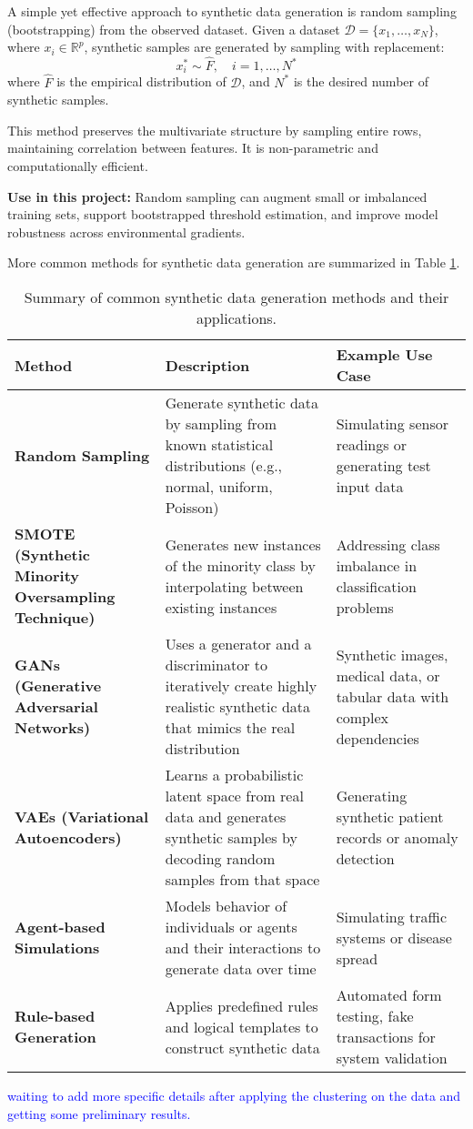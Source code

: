 A simple yet effective approach to synthetic data generation is random sampling (bootstrapping) from the observed dataset.
 Given a dataset \( \mathcal{D} = \{x_1, \dots, x_N\} \), where \( x_i \in \mathbb{R}^p \), 
 synthetic samples are generated by sampling with replacement:
\[
x_i^* \sim \hat{F}, \quad i = 1, \dots, N^*
\]
where \( \hat{F} \) is the empirical distribution of \( \mathcal{D} \), and \( N^* \) is
 the desired number of synthetic samples.

This method preserves the multivariate structure by sampling entire rows, maintaining correlation between features.
 It is non-parametric and computationally efficient.

\textbf{Use in this project:} Random sampling can augment small or imbalanced training sets, support bootstrapped 
threshold estimation, and improve model robustness across environmental gradients.

More common methods for synthetic data generation are summarized in Table \ref{tab:synthetic_data_methods}.

\begin{table}[!h]
\centering
\caption{Summary of common synthetic data generation methods and their applications.}
\label{tab:synthetic_data_methods}
\renewcommand{\arraystretch}{1.3}
\small
\begin{tabular}{|>{\centering\arraybackslash}p{3.5cm}|>{\centering\arraybackslash}p{7cm}|>{\centering\arraybackslash}p{4.2cm}|}
\hline
\textbf{Method} & \textbf{Description} & \textbf{Example Use Case} \\
\hline
\textbf{Random Sampling} & Generate synthetic data by sampling from known statistical distributions (e.g., normal, uniform, Poisson) & Simulating sensor readings or generating test input data \\
\hline
\textbf{SMOTE (Synthetic Minority Oversampling Technique)} & Generates new instances of the minority class by interpolating between existing instances & Addressing class imbalance in classification problems \\
\hline
\textbf{GANs (Generative Adversarial Networks)} & Uses a generator and a discriminator to iteratively create highly realistic synthetic data that mimics the real distribution & Synthetic images, medical data, or tabular data with complex dependencies \\
\hline
\textbf{VAEs (Variational Autoencoders)} & Learns a probabilistic latent space from real data and generates synthetic samples by decoding random samples from that space & Generating synthetic patient records or anomaly detection \\
\hline
\textbf{Agent-based Simulations} & Models behavior of individuals or agents and their interactions to generate data over time & Simulating traffic systems or disease spread \\
\hline
\textbf{Rule-based Generation} & Applies predefined rules and logical templates to construct synthetic data & Automated form testing, fake transactions for system validation \\
\hline
\end{tabular}
\end{table}

\textcolor{blue}{waiting to add more specific details after applying the clustering on the data and getting
some preliminary results.}
